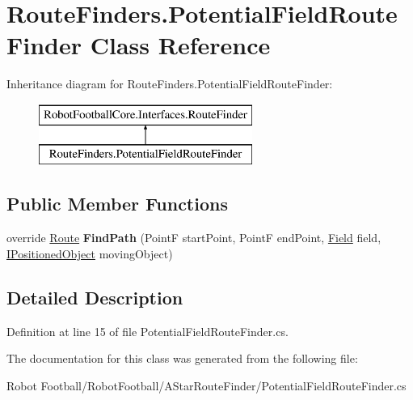 \hypertarget{class_route_finders_1_1_potential_field_route_finder}{\section{Route\-Finders.\-Potential\-Field\-Route\-Finder Class Reference}
\label{class_route_finders_1_1_potential_field_route_finder}
}
Inheritance diagram for Route\-Finders.\-Potential\-Field\-Route\-Finder\-:\begin{figure}[H]
\begin{center}
\leavevmode
\includegraphics[height=2.000000cm]{class_route_finders_1_1_potential_field_route_finder}
\end{center}
\end{figure}
\subsection*{Public Member Functions}
\begin{DoxyCompactItemize}
\item 
\hypertarget{class_route_finders_1_1_potential_field_route_finder_ac72bef7af2f4350f02677f083d337efb}{override \hyperlink{class_robot_football_core_1_1_route_objects_1_1_route}{Route} {\bfseries Find\-Path} (Point\-F start\-Point, Point\-F end\-Point, \hyperlink{class_robot_football_core_1_1_objects_1_1_field}{Field} field, \hyperlink{interface_robot_football_core_1_1_interfaces_1_1_i_positioned_object}{I\-Positioned\-Object} moving\-Object)}\label{class_route_finders_1_1_potential_field_route_finder_ac72bef7af2f4350f02677f083d337efb}

\end{DoxyCompactItemize}


\subsection{Detailed Description}


Definition at line 15 of file Potential\-Field\-Route\-Finder.\-cs.



The documentation for this class was generated from the following file\-:\begin{DoxyCompactItemize}
\item 
Robot Football/\-Robot\-Football/\-A\-Star\-Route\-Finder/Potential\-Field\-Route\-Finder.\-cs\end{DoxyCompactItemize}
